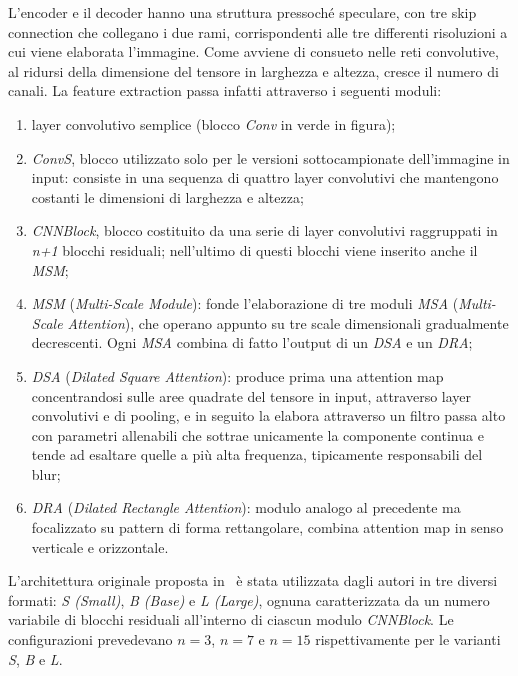 \documentclass[a4paper,10pt,twocolumn]{article}
\begin{document}
L'encoder e il decoder hanno una struttura pressoché speculare, con tre skip connection che collegano i due rami, corrispondenti alle tre differenti risoluzioni a cui viene elaborata l'immagine. Come avviene di consueto nelle reti convolutive,
al ridursi della dimensione del tensore in larghezza e altezza, cresce il numero di canali. La feature extraction passa infatti attraverso i seguenti moduli:
\begin{enumerate}[label=\textbf{(\alph*)}]
  \item layer convolutivo semplice (blocco \textit{Conv} in verde in figura);
  \item \textit{ConvS}, blocco utilizzato solo per le versioni sottocampionate dell'immagine in input: consiste in una sequenza di quattro layer convolutivi che mantengono costanti le dimensioni di larghezza e altezza;
  \item \textit{CNNBlock}, blocco costituito da una serie di layer convolutivi raggruppati in \textit{n+1} blocchi residuali; nell'ultimo di questi blocchi viene inserito anche il \textit{MSM};
  \item \textit{MSM} (\textit{Multi-Scale Module}): fonde l'elaborazione di tre moduli \textit{MSA} (\textit{Multi-Scale Attention}), che operano appunto su tre scale dimensionali gradualmente decrescenti.
    Ogni \textit{MSA} combina di fatto l'output di un \textit{DSA} e un \textit{DRA};
  \item \textit{DSA} (\textit{Dilated Square Attention}): produce prima una attention map concentrandosi sulle aree quadrate del tensore in input, attraverso layer convolutivi e di pooling,
    e in seguito la elabora attraverso un filtro passa alto con parametri allenabili che sottrae unicamente la componente continua e tende ad esaltare quelle a più alta frequenza,
    tipicamente responsabili del blur;
  \item \textit{DRA} (\textit{Dilated Rectangle Attention}): modulo analogo al precedente ma focalizzato su pattern di forma rettangolare, combina attention map in senso verticale e orizzontale.
\end{enumerate}

L'architettura originale proposta in~\cite{convir} è stata utilizzata dagli autori in tre diversi formati: \textit{S (Small)}, \textit{B (Base)} e \textit{L (Large)}, ognuna caratterizzata da un numero variabile di blocchi residuali all'interno di ciascun modulo \textit{CNNBlock}.
Le configurazioni prevedevano \(n=3\), \(n=7\) e \(n=15\) rispettivamente per le varianti \textit{S}, \textit{B} e \textit{L}.
\end{document}
